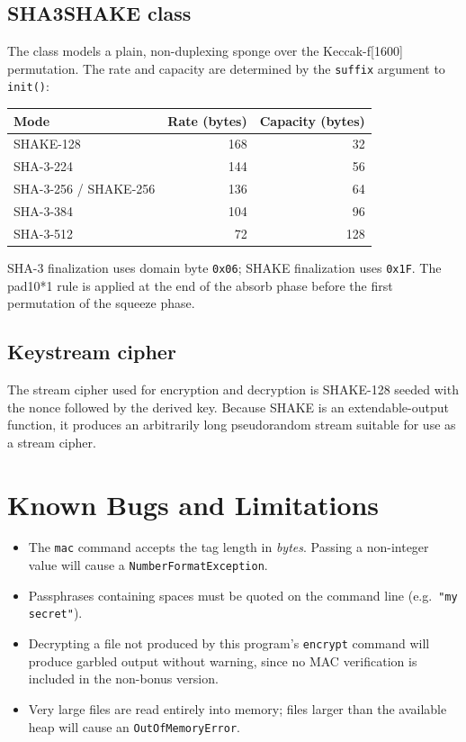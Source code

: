 \documentclass[11pt]{article}
\begin{document}
\subsection*{SHA3SHAKE class}

The class models a plain, non-duplexing sponge over the Keccak-f[1600]
permutation. The rate and capacity are determined by the \texttt{suffix}
argument to \texttt{init()}:

\begin{center}
\begin{tabular}{lrr}
\toprule
\textbf{Mode} & \textbf{Rate (bytes)} & \textbf{Capacity (bytes)} \\
\midrule
SHAKE-128                  & 168 &  32 \\
SHA-3-224                  & 144 &  56 \\
SHA-3-256 / SHAKE-256      & 136 &  64 \\
SHA-3-384                  & 104 &  96 \\
SHA-3-512                  &  72 & 128 \\
\bottomrule
\end{tabular}
\end{center}

SHA-3 finalization uses domain byte \texttt{0x06}; SHAKE finalization uses
\texttt{0x1F}. The pad10*1 rule is applied at the end of the absorb phase
before the first permutation of the squeeze phase.

\subsection*{Keystream cipher}

The stream cipher used for encryption and decryption is SHAKE-128 seeded with
the nonce followed by the derived key. Because SHAKE is an extendable-output
function, it produces an arbitrarily long pseudorandom stream suitable for
use as a stream cipher.

\section{Known Bugs and Limitations}

\begin{itemize}[noitemsep]
  \item The \texttt{mac} command accepts the tag length in \emph{bytes}.
        Passing a non-integer value will cause a \texttt{NumberFormatException}.
  \item Passphrases containing spaces must be quoted on the command line
        (e.g.\ \texttt{"my secret"}).
  \item Decrypting a file not produced by this program's \texttt{encrypt}
        command will produce garbled output without warning, since no MAC
        verification is included in the non-bonus version.
  \item Very large files are read entirely into memory; files larger than the
        available heap will cause an \texttt{OutOfMemoryError}.
\end{itemize}
\end{document}
